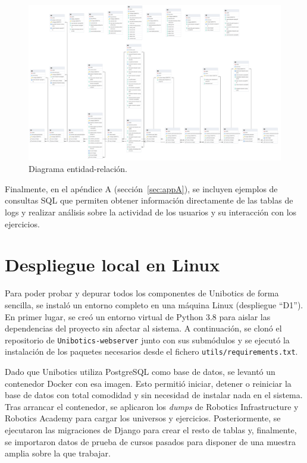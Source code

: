 \documentclass[a4paper, 12pt]{book}
\begin{document}
\begin{landscape}
    \begin{figure}[H]
        \centering
        \includegraphics[height=0.9\textheight, keepaspectratio]{img/ER.png}
        \caption{Diagrama entidad-relación.}
        \label{fig:ER}
    \end{figure}
\end{landscape}

Finalmente, en el apéndice A (sección~\ref{sec:appA}), se incluyen ejemplos de consultas SQL que permiten obtener información directamente de las tablas de logs y realizar análisis sobre la actividad de los usuarios y su interacción con los ejercicios.


\section{Despliegue local en Linux}

Para poder probar y depurar todos los componentes de Unibotics de forma sencilla, se instaló un entorno completo en una máquina Linux (despliegue “D1”). En primer lugar, se creó un entorno virtual de Python 3.8 para aislar las dependencias del proyecto sin afectar al sistema. A continuación, se clonó el repositorio de \texttt{Unibotics-webserver} junto con sus submódulos y se ejecutó la instalación de los paquetes necesarios desde el fichero \texttt{utils/requirements.txt}.

Dado que Unibotics utiliza PostgreSQL como base de datos, se levantó un contenedor Docker con esa imagen. Esto permitió iniciar, detener o reiniciar la base de datos con total comodidad y sin necesidad de instalar nada en el sistema. Tras arrancar el contenedor, se aplicaron los \textit{dumps} de Robotics Infrastructure y Robotics Academy para cargar los universos y ejercicios. Posteriormente, se ejecutaron las migraciones de Django para crear el resto de tablas y, finalmente, se importaron datos de prueba de cursos pasados para disponer de una muestra amplia sobre la que trabajar.
\end{document}
